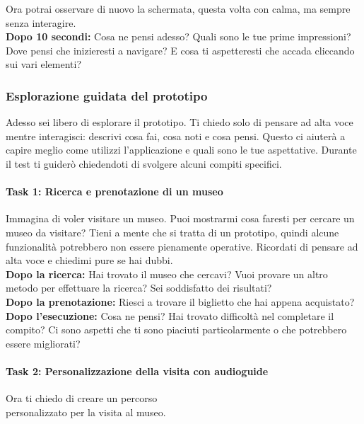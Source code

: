 \documentclass{article}
\begin{document}
Ora potrai osservare di nuovo la schermata, questa volta con calma, ma sempre senza interagire.\\

\textbf{Dopo 10 secondi:} 
Cosa ne pensi adesso? Quali sono le tue prime impressioni? Dove pensi che inizieresti a navigare? E cosa ti aspetteresti che accada cliccando sui vari elementi?

\subsubsection{Esplorazione guidata del prototipo}
Adesso sei libero di esplorare il prototipo. Ti chiedo solo di pensare ad alta voce mentre interagisci: descrivi cosa fai, cosa noti e cosa pensi. Questo ci aiuterà a capire meglio come utilizzi l’applicazione e quali sono le tue aspettative. Durante il test ti guiderò chiedendoti di svolgere alcuni compiti specifici.

\paragraph*{Task 1: Ricerca e prenotazione di un museo}
Immagina di voler visitare un museo. Puoi mostrarmi cosa faresti per cercare un museo da visitare? Tieni a mente che si tratta di un prototipo, quindi alcune funzionalità potrebbero non essere pienamente operative. Ricordati di pensare ad alta voce e chiedimi pure se hai dubbi.\\

\textbf{Dopo la ricerca:} 
Hai trovato il museo che cercavi? Vuoi provare un altro metodo per effettuare la ricerca? Sei soddisfatto dei risultati?\\

\textbf{Dopo la prenotazione:} 
Riesci a trovare il biglietto che hai appena acquistato?\\

\textbf{Dopo l'esecuzione:} 
Cosa ne pensi? Hai trovato difficoltà nel completare il compito? Ci sono aspetti che ti sono piaciuti particolarmente o che potrebbero essere migliorati?

\paragraph*{Task 2: Personalizzazione della visita con audioguide}
Ora ti chiedo di creare un percorso\\ personalizzato per la visita al museo.\\
\end{document}

